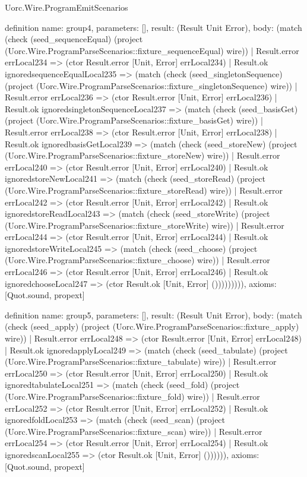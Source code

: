 \begin{lexlean}{Uorc.Wire.ProgramEmitScenarios}
\begin{semanticmodule}
definition{
  name: group4,
  parameters: [],
  result: (Result Unit Error),
  body: (match (check (seed_sequenceEqual) (project (Uorc.Wire.ProgramParseScenarios::fixture_sequenceEqual) wire))
    | Result.error errLocal234 => (ctor Result.error [Unit, Error] errLocal234)
    | Result.ok ignoredsequenceEqualLocal235 => (match (check (seed_singletonSequence) (project (Uorc.Wire.ProgramParseScenarios::fixture_singletonSequence) wire))
      | Result.error errLocal236 => (ctor Result.error [Unit, Error] errLocal236)
      | Result.ok ignoredsingletonSequenceLocal237 => (match (check (seed_basisGet) (project (Uorc.Wire.ProgramParseScenarios::fixture_basisGet) wire))
        | Result.error errLocal238 => (ctor Result.error [Unit, Error] errLocal238)
        | Result.ok ignoredbasisGetLocal239 => (match (check (seed_storeNew) (project (Uorc.Wire.ProgramParseScenarios::fixture_storeNew) wire))
          | Result.error errLocal240 => (ctor Result.error [Unit, Error] errLocal240)
          | Result.ok ignoredstoreNewLocal241 => (match (check (seed_storeRead) (project (Uorc.Wire.ProgramParseScenarios::fixture_storeRead) wire))
            | Result.error errLocal242 => (ctor Result.error [Unit, Error] errLocal242)
            | Result.ok ignoredstoreReadLocal243 => (match (check (seed_storeWrite) (project (Uorc.Wire.ProgramParseScenarios::fixture_storeWrite) wire))
              | Result.error errLocal244 => (ctor Result.error [Unit, Error] errLocal244)
              | Result.ok ignoredstoreWriteLocal245 => (match (check (seed_choose) (project (Uorc.Wire.ProgramParseScenarios::fixture_choose) wire))
                | Result.error errLocal246 => (ctor Result.error [Unit, Error] errLocal246)
                | Result.ok ignoredchooseLocal247 => (ctor Result.ok [Unit, Error] ())))))))),
  axioms: [Quot.sound, propext]
}

definition{
  name: group5,
  parameters: [],
  result: (Result Unit Error),
  body: (match (check (seed_apply) (project (Uorc.Wire.ProgramParseScenarios::fixture_apply) wire))
    | Result.error errLocal248 => (ctor Result.error [Unit, Error] errLocal248)
    | Result.ok ignoredapplyLocal249 => (match (check (seed_tabulate) (project (Uorc.Wire.ProgramParseScenarios::fixture_tabulate) wire))
      | Result.error errLocal250 => (ctor Result.error [Unit, Error] errLocal250)
      | Result.ok ignoredtabulateLocal251 => (match (check (seed_fold) (project (Uorc.Wire.ProgramParseScenarios::fixture_fold) wire))
        | Result.error errLocal252 => (ctor Result.error [Unit, Error] errLocal252)
        | Result.ok ignoredfoldLocal253 => (match (check (seed_scan) (project (Uorc.Wire.ProgramParseScenarios::fixture_scan) wire))
          | Result.error errLocal254 => (ctor Result.error [Unit, Error] errLocal254)
          | Result.ok ignoredscanLocal255 => (ctor Result.ok [Unit, Error] ()))))),
  axioms: [Quot.sound, propext]
}


\end{semanticmodule}
\end{lexlean}
